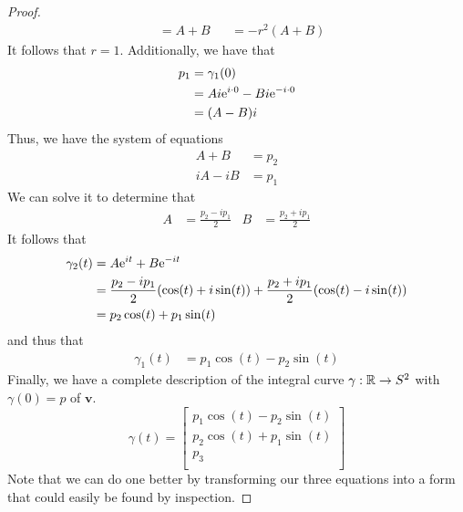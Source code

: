\documentclass[../psets.tex]{subfiles}
\begin{document}
\begin{enumerate}[label={\textbf{4.3.\roman*.}}]
\begin{enumerate}
\begin{proof}
\begin{align*}
                &= A+B&
                    &= -r^2(A+B)
            \end{align*}
            It follows that $r=1$. Additionally, we have that
            \begin{align*}
                p_1 &= \gamma_1(0)\\
                &= Ai\e[i\cdot 0]-Bi\e[-i\cdot 0]\\
                &= (A-B)i
            \end{align*}
            Thus, we have the system of equations
            \begin{align*}
                A+B &= p_2\\
                iA-iB &= p_1
            \end{align*}
            We can solve it to determine that
            \begin{align*}
                A &= \frac{p_2-ip_1}{2}&
                B &= \frac{p_2+ip_1}{2}
            \end{align*}
            It follows that
            \begin{align*}
                \gamma_2(t) &= A\e[it]+B\e[-it]\\
                &= \frac{p_2-ip_1}{2}(\cos(t)+i\sin(t))+\frac{p_2+ip_1}{2}(\cos(t)-i\sin(t))\\
                &= p_2\cos(t)+p_1\sin(t)
            \end{align*}
            and thus that
            \begin{align*}
                \gamma_1(t) &= p_1\cos(t)-p_2\sin(t)
            \end{align*}
            Finally, we have a complete description of the integral curve $\gamma:\R\to S^2$ with $\gamma(0)=p$ of $\bm{v}$.
            \begin{equation*}
                \boxed{
                    \gamma(t) =
                    \begin{bmatrix}
                        p_1\cos(t)-p_2\sin(t)\\
                        p_2\cos(t)+p_1\sin(t)\\
                        p_3\\
                    \end{bmatrix}
                }
            \end{equation*}
            Note that we can do one better by transforming our three equations into a form that could easily be found by inspection.\par

\end{proof}
\end{enumerate}
\end{enumerate}
\end{document}
